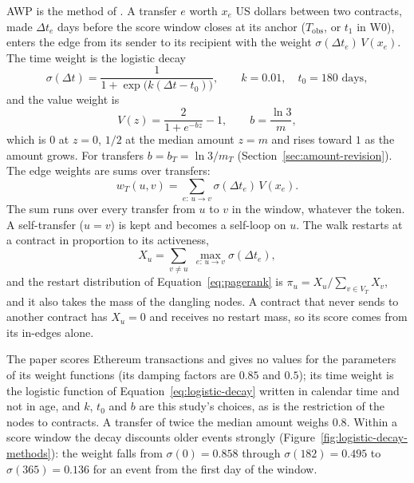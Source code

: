 AWP is the method of \textcite{do2023awp}. A transfer $e$ worth $x_e$ US dollars between two contracts, made $\Delta t_e$ days before the score window closes at its anchor ($T_{\mathrm{obs}}$, or $t_1$ in W0), enters the edge from its sender to its recipient with the weight $\sigma(\Delta t_e)\,V(x_e)$. The time weight is the logistic decay
\begin{equation}
\label{eq:logistic-decay}
\sigma(\Delta t)
=
\frac{1}{1+\exp\bigl(k(\Delta t-t_0)\bigr)},
\qquad
k=0.01,\quad t_0=180\text{ days},
\end{equation}
and the value weight is
\begin{equation}
\label{eq:value-transform}
V(z)
=
\frac{2}{1+e^{-bz}}-1,
\qquad
b=\frac{\ln 3}{m},
\end{equation}
which is $0$ at $z=0$, $1/2$ at the median amount $z=m$ and rises toward $1$ as the amount grows. For transfers $b=b_T=\ln 3/m_T$ (Section~\ref{sec:amount-revision}). The edge weights are sums over transfers:
\begin{equation}
\label{eq:transfer-weight}
w_T(u,v)
=
\sum_{e:\,u\to v}
\sigma(\Delta t_e)\,V(x_e).
\end{equation}
The sum runs over every transfer from $u$ to $v$ in the window, whatever the token. A self-transfer ($u=v$) is kept and becomes a self-loop on $u$. The walk restarts at a contract in proportion to its activeness,
\begin{equation}
\label{eq:activeness}
X_u
=
\sum_{v\neq u}\;
\max_{e:\,u\to v}\sigma(\Delta t_e),
\end{equation}
and the restart distribution of Equation~\eqref{eq:pagerank} is $\pi_u=X_u/\sum_{v\in V_T}X_v$, and it also takes the mass of the dangling nodes. A contract that never sends to another contract has $X_u=0$ and receives no restart mass, so its score comes from its in-edges alone.

The paper scores Ethereum transactions and gives no values for the parameters of its weight functions (its damping factors are $0.85$ and $0.5$); its time weight is the logistic function of Equation~\eqref{eq:logistic-decay} written in calendar time and not in age, and $k$, $t_0$ and $b$ are this study's choices, as is the restriction of the nodes to contracts. A transfer of twice the median amount weighs $0.8$. Within a score window the decay discounts older events strongly (Figure~\ref{fig:logistic-decay-methods}): the weight falls from $\sigma(0)=0.858$ through $\sigma(182)=0.495$ to $\sigma(365)=0.136$ for an event from the first day of the window.

